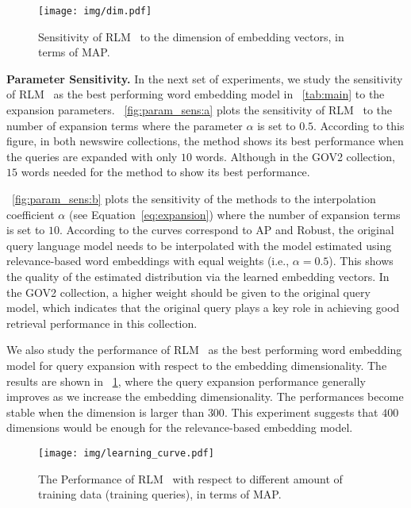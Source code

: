 \documentclass[sigconf]{acmart}
\begin{document}
\begin{figure}[t]
\vspace{-0.3cm}
    \centering
    \texttt{[image: img/dim.pdf]}
    \caption{Sensitivity of {RLM~} to the dimension of embedding vectors, in terms of MAP.}
    \label{fig:dim}
    \vspace{-0.3cm}
\end{figure}

\textbf{Parameter Sensitivity.} In the next set of experiments, we study the sensitivity of {RLM~} as the best performing word embedding model in \tablename~\ref{tab:main} to the expansion parameters. \figurename~\ref{fig:param_sens:a} plots the sensitivity of {RLM~} to the number of expansion terms where the parameter $\alpha$ is set to $0.5$. According to this figure, in both newswire collections, the method shows its best performance when the queries are expanded with only $10$ words. Although in the GOV2 collection, $15$ words needed for the method to show its best performance.

\figurename~\ref{fig:param_sens:b} plots the sensitivity of the methods to the interpolation coefficient $\alpha$ (see {Equation}~\ref{eq:expansion}) where the number of expansion terms is set to $10$. According to the curves correspond to AP and Robust, the original query language model needs to be interpolated with the model estimated using relevance-based word embeddings with equal weights (i.e., $\alpha = 0.5$). This shows the quality of the estimated distribution via the learned embedding vectors. In the GOV2 collection, a higher weight should be given to the original query model, which indicates that the original query plays a key role in achieving good retrieval performance in this collection. 

We also study the performance of {RLM~} as the best performing word embedding model for query expansion with respect to the embedding dimensionality. The results are shown in \figurename~\ref{fig:dim}, where the query expansion performance generally improves as we increase the embedding dimensionality. The performances become stable when the dimension is larger than $300$. This experiment suggests that $400$ dimensions would be enough for the relevance-based embedding model.

\begin{figure}[t]
\vspace{-0.3cm}
    \centering
    \texttt{[image: img/learning\_curve.pdf]}
    \caption{The Performance of {RLM~} with respect to different amount of training data (training queries), in terms of MAP.}
    \label{fig:lcurve}
    \vspace{-0.4cm}
\end{figure}
\end{document}
